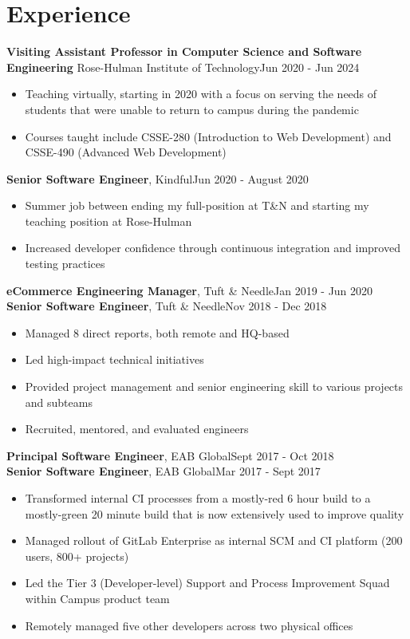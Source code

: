 \section{Experience}


{\bf Visiting Assistant Professor in Computer Science and Software Engineering} Rose-Hulman Institute of Technology\hfill Jun 2020 - Jun 2024
\begin{itemize} \itemsep -2pt  %
  \item Teaching virtually, starting in 2020 with a focus on serving the needs of students that were unable to return to campus during the pandemic
  \item Courses taught include CSSE-280 (Introduction to Web Development) and CSSE-490 (Advanced Web Development)
\end{itemize}

{\bf Senior Software Engineer}, Kindful\hfill Jun 2020 - August 2020
\begin{itemize} \itemsep -2pt  %
    \item Summer job between ending my full-position at T\&N and starting my teaching position at Rose-Hulman
  \item Increased developer confidence through continuous integration and improved testing practices
\end{itemize}

{\bf eCommerce Engineering Manager}, Tuft \& Needle\hfill Jan 2019 - Jun 2020\\
{\bf Senior Software Engineer}, Tuft \& Needle\hfill Nov 2018 - Dec 2018
\begin{itemize} \itemsep -2pt  %
  \item Managed 8 direct reports, both remote and HQ-based
  \item Led high-impact technical initiatives
  \item Provided project management and senior engineering skill to various projects and subteams
  \item Recruited, mentored, and evaluated engineers
\end{itemize}

{\bf Principal Software Engineer}, EAB Global\hfill Sept 2017 - Oct 2018\\
{\bf Senior Software Engineer}, EAB Global\hfill Mar 2017 - Sept 2017
\begin{itemize} \itemsep -2pt  %
  \item Transformed internal CI processes from a mostly-red 6 hour build to a mostly-green 20 minute build that is now extensively used to improve quality
  \item Managed rollout of GitLab Enterprise as internal SCM and CI platform (200 users, 800+ projects)
  \item Led the Tier 3 (Developer-level) Support and Process Improvement Squad within Campus product team
  \item Remotely managed five other developers across two physical offices
\end{itemize}

